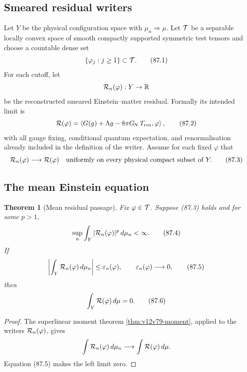 \documentclass[11pt]{article}
\newtheorem{theorem}{Theorem}[section]
\theoremstyle{remark}
\begin{document}
\subsection{Smeared residual writers}

Let \(Y\) be the physical configuration space with
\(\mu_n\Rightarrow\mu\).  Let \({\cal T}\) be a separable locally
convex space of smooth compactly supported symmetric test tensors
and choose a countable dense set
\[
                         \{\varphi_j:j\geq1\}\subset{\cal T}. \tag{87.1}
\]
For each cutoff, let
\[
                         {\cal R}_n(\varphi):Y\to\mathbb R
\]
be the reconstructed smeared Einstein--matter residual.  Formally
its intended limit is
\begin{equation}
 {\cal R}(\varphi)
 =
 \left\langle
 G(g)+\Lambda g-8\pi G_{\!N}\,T_{\rm ren},
 \varphi\right\rangle,                                     \tag{87.2}
\end{equation}
with all gauge fixing, conditional quantum expectation, and
renormalisation already included in the definition of the writer.
Assume for each fixed \(\varphi\) that
\begin{equation}
 {\cal R}_n(\varphi)\longrightarrow{\cal R}(\varphi)
 \quad\text{uniformly on every physical compact subset of }Y.       \tag{87.3}
\end{equation}

\subsection{The mean Einstein equation}

\begin{theorem}[Mean residual passage]
\label{thm:v12v87-mean}
Fix \(\varphi\in{\cal T}\).  Suppose (87.3) holds and for some
\(p>1\),
\begin{equation}
 \sup_n\int_Y|{\cal R}_n(\varphi)|^p\,d\mu_n<\infty.         \tag{87.4}
\end{equation}
If
\begin{equation}
 \left|\int_Y{\cal R}_n(\varphi)\,d\mu_n\right|
 \leq\varepsilon_n(\varphi),
 \qquad\varepsilon_n(\varphi)\longrightarrow0,              \tag{87.5}
\end{equation}
then
\begin{equation}
                         \int_Y{\cal R}(\varphi)\,d\mu=0.     \tag{87.6}
\end{equation}
\end{theorem}

\begin{proof}
The superlinear moment theorem
\ref{thm:v12v79-moment}, applied to the writers
\({\cal R}_n(\varphi)\), gives
\[
 \int{\cal R}_n(\varphi)\,d\mu_n
 \longrightarrow
 \int{\cal R}(\varphi)\,d\mu.
\]
Equation (87.5) makes the left limit zero.
\end{proof}
\end{document}
